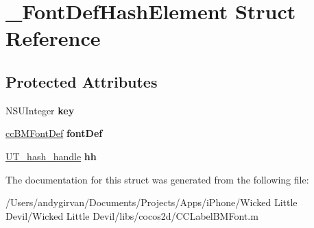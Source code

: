 \hypertarget{struct___font_def_hash_element}{\section{\-\_\-\-Font\-Def\-Hash\-Element Struct Reference}
\label{struct___font_def_hash_element}
}
\subsection*{Protected Attributes}
\begin{DoxyCompactItemize}
\item 
\hypertarget{struct___font_def_hash_element_adaaf0584f3b8ca73f9afa4df9449a149}{N\-S\-U\-Integer {\bfseries key}}\label{struct___font_def_hash_element_adaaf0584f3b8ca73f9afa4df9449a149}

\item 
\hypertarget{struct___font_def_hash_element_a4887695b981bfbcee58df5a57e7b72c8}{\hyperlink{structcc_b_m_font_def}{cc\-B\-M\-Font\-Def} {\bfseries font\-Def}}\label{struct___font_def_hash_element_a4887695b981bfbcee58df5a57e7b72c8}

\item 
\hypertarget{struct___font_def_hash_element_a0d67721facc6a1d012f086f994d76eed}{\hyperlink{struct_u_t__hash__handle}{U\-T\-\_\-hash\-\_\-handle} {\bfseries hh}}\label{struct___font_def_hash_element_a0d67721facc6a1d012f086f994d76eed}

\end{DoxyCompactItemize}


The documentation for this struct was generated from the following file\-:\begin{DoxyCompactItemize}
\item 
/\-Users/andygirvan/\-Documents/\-Projects/\-Apps/i\-Phone/\-Wicked Little Devil/\-Wicked Little Devil/libs/cocos2d/C\-C\-Label\-B\-M\-Font.\-m\end{DoxyCompactItemize}
